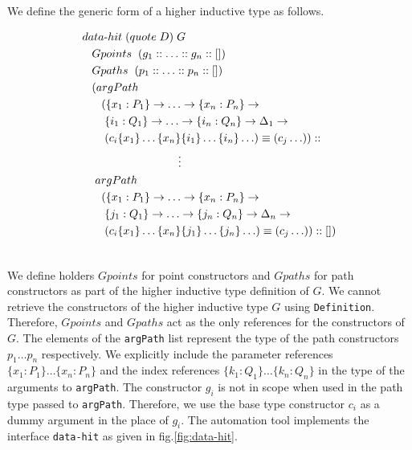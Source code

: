 \documentclass[sigplan,10pt]{acmart}
\begin{document}
We define the generic form of a higher inductive type as follows.
\begin{center}
\begingroup
\fontsize{7.9pt}{0pt}\selectfont
\begin{align}
& data{\text -}hit \hspace {0.1cm} (quote \hspace {0.1cm} D) \hspace {0.1cm} G \nonumber \\
  & \hspace {0.3cm} Gpoints \hspace {0.2cm} (g_1 ::  \ldots :: g_n :: []) \nonumber \\
  & \hspace {0.3cm} Gpaths  \hspace {0.2cm} (p_1 :: \ldots :: p_n :: []) \nonumber \\
  & \hspace {0.3cm} (argPath \nonumber \\
  & \hspace {0.6cm} (\{x_1:P_1\} \rightarrow \ldots \rightarrow \{x_n:P_n\} \rightarrow \nonumber \\
  & \hspace {0.7cm} \{i_1:Q_1\} \rightarrow \ldots \rightarrow \{i_n:Q_n\} \rightarrow \Delta_1 \rightarrow \nonumber \\
  & \hspace {0.7cm} (c_i \{x_1\} \ldots \{x_n\} \{i_1\} \ldots \{i_n\} \ldots) \equiv (c_j \ldots)) :: \nonumber \\
  & \hspace {3cm} \vdots \nonumber \\
  & \hspace {0.4cm} argPath \nonumber \\
  & \hspace {0.6cm} (\{x_1:P_1\} \rightarrow \ldots \rightarrow \{x_n:P_n\} \rightarrow \nonumber \\
  & \hspace {0.7cm} \{j_1:Q_1\} \rightarrow \ldots \rightarrow \{j_n:Q_n\} \rightarrow \Delta_n \rightarrow \nonumber \\
  & \hspace {0.7cm} (c_i \{x_1\} \ldots \{x_n\} \{j_1\} \ldots \{j_n\} \ldots) \equiv (c_j \ldots)) :: [])\nonumber \\ \nonumber
\end{align}
\endgroup
\end{center}
\normalsize

We define holders $Gpoints$ for point constructors and $Gpaths$ for path constructors as part of the higher inductive type definition of $G$. We cannot retrieve the constructors of the higher inductive type $G$ using {\tt Definition}. Therefore, $Gpoints$ and $Gpaths$ act as the only references for the constructors of $G$. The elements of the {\tt argPath} list represent the type of the path constructors $p_1 \ldots p_n$ respectively. We explicitly include the parameter references $\{x_1 : P_1\} \ldots \{x_n : P_n\}$ and the index references $\{k_1 : Q_1\} \ldots \{k_n : Q_n\}$ in the type of the arguments to {\tt argPath}. The constructor $g_i$ is not in scope when used in the path type passed to {\tt argPath}. Therefore, we use the base type constructor $c_i$ as a dummy argument in the place of $g_i$. The automation tool implements the interface {\tt data-hit} as given in fig.\eqref{fig:data-hit}.
\end{document}

